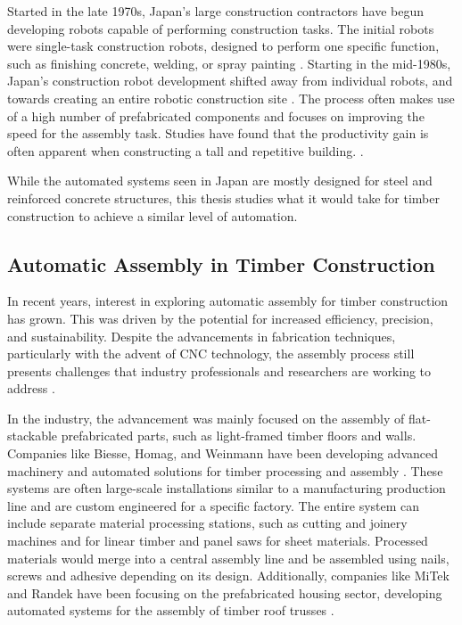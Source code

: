 Started in the late 1970s, Japan’s large construction contractors have begun developing robots capable of performing construction tasks. The initial robots were single-task construction robots, designed to perform one specific function, such as finishing concrete, welding, or spray painting \parencite{potterJapanSkyscraperFactories2022}. Starting in the mid-1980s, Japan’s construction robot development shifted away from individual robots, and towards creating an entire robotic construction site \parencite{maedaCurrentResearchDevelopment2005}. The process often makes use of a high number of prefabricated components and focuses on improving the speed for the assembly task. Studies have found that the productivity gain is often apparent when constructing a tall and repetitive building. \parencite{linnerAutomatedRoboticConstruction2013,potterJapanSkyscraperFactories2022}. 

While the automated systems seen in Japan are mostly designed for steel and reinforced concrete structures, this thesis studies what it would take for timber construction to achieve a similar level of automation. 

\subsection{Automatic Assembly in Timber Construction}
\label{subsection:introduction-automatic-assembly-in-timber-construction}

In recent years, interest in exploring automatic assembly for timber construction has grown. This was driven by the potential for increased efficiency, precision, and sustainability. Despite the advancements in fabrication techniques, particularly with the advent of CNC technology, the assembly process still presents challenges that industry professionals and researchers are working to address \parencite{willmannNewParadigmsAutomatic2016}.

In the industry, the advancement was mainly focused on the assembly of flat-stackable prefabricated parts, such as light-framed timber floors and walls. Companies like Biesse, Homag, and Weinmann have been developing advanced machinery and automated solutions for timber processing and assembly \parencite{kooTECHNOLOGYGAPSACHIEVE2021}. These systems are often large-scale installations similar to a manufacturing production line and are custom engineered for a specific factory. The entire system can include separate material processing stations, such as cutting and joinery machines and for linear timber and panel saws for sheet materials. Processed materials would merge into a central assembly line and be assembled using nails, screws and adhesive depending on its design. Additionally, companies like MiTek and Randek have been focusing on the prefabricated housing sector, developing automated systems for the assembly of timber roof trusses \parencite{ianharveyRoboticArmsAI2018}. 

